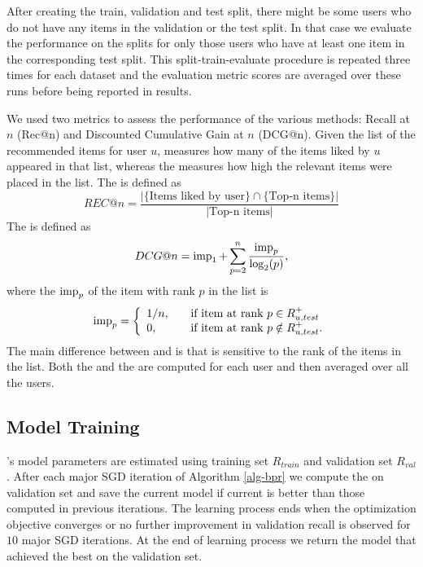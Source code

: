 After creating the train, validation and test split, there might be some users who do
not have
any items in the validation or the test split. In that case we evaluate the performance on
the splits for only those users who have at least one item in the corresponding test split.
This split-train-evaluate procedure is repeated three times for each dataset and
the evaluation metric scores are averaged over these runs before being reported in
results.

We used two metrics to assess the performance of the various methods: Recall at
$n$ (Rec@n) and Discounted Cumulative Gain at $n$ (DCG@n).
Given the list of the \TOPN recommended items for user $u$, \RECN measures how
many of the items liked by $u$ appeared in that list, whereas the \DCGN measures
how high the relevant items were placed in the list. 
The \RECN is defined as 
\begin{equation*}
  REC@n = \frac{|\{\mbox{Items liked by user}\} \cap \{\mbox{Top-n 
  items}\}|}{|\mbox{Top-n items}|}
\end{equation*}
The \DCGN is defined as
\begin{equation*}
  DCG@n= \operatorname{imp}_1 + \sum_{p=2}^{n} \frac{\operatorname{imp}_p}{\log_2(p)},
\end{equation*} 
where the $\operatorname{imp}_p$ of the item with rank $p$ in the \TOPN list is
%
\begin{equation*}
\operatorname{imp}_p = \left\{
  \begin{array}{l l}
    1/n, & \quad \text{if item at rank $p \in R_{u,test}^+$}\\
    0, & \quad \text{if item at rank $p \notin R_{u,test}^+$}.
  \end{array} \right. 
  \end{equation*} 
The main difference between \RECN and \DCGN is that \DCGN is sensitive to the rank of the 
items in the \TOPN list. Both the \RECN and the \DCGN are computed for each user and then 
averaged over all the users. 
%

\subsection{Model Training} \label{evaluation}
\CF's model parameters are estimated using training set $R_{train}$ and
validation set $R_{val}$. After each
major SGD iteration of Algorithm \ref{alg-bpr} we compute
the \RECN on validation set and save the current model if current \RECN is 
better than those computed in previous iterations. The learning process ends when
the optimization objective converges or no further improvement in validation recall 
is observed for $10$ major SGD iterations. At the end of learning process we return the model that achieved the best \RECN on
the validation set.

